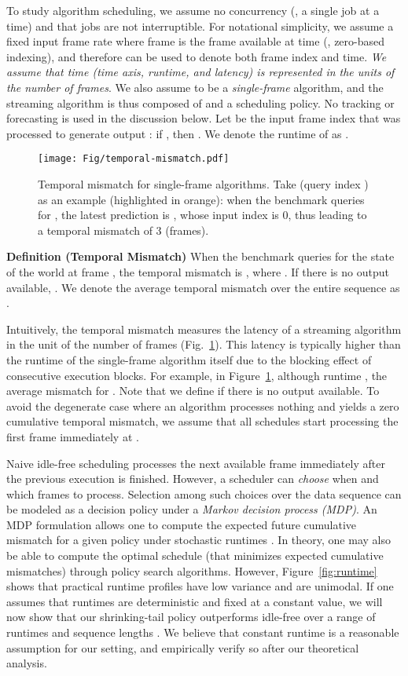 To study algorithm scheduling, we assume no concurrency (\ie, a single job at a time) and that jobs are not interruptible. For notational simplicity, we assume a fixed input frame rate where frame  is the frame available at time  (\ie, zero-based indexing), and therefore  can be used to denote both frame index and time. {\em We assume that time (time axis, runtime, and latency) is represented in the units of the number of frames}. We also assume  to be a {\em single-frame} algorithm, and the streaming algorithm  is thus composed of  and a scheduling policy. No tracking or forecasting is used in the discussion below.
Let  be the input frame index that was processed to generate output : if , then . We denote the runtime of  as . 

\begin{figure}[!b]
\centering
\texttt{[image: Fig/temporal-mismatch.pdf]}

\caption{Temporal mismatch for single-frame algorithms. Take  
(query index )
as an example (highlighted in orange): when the benchmark queries for , the latest prediction is , whose input index is 0, thus leading to a temporal mismatch of 3 (frames).}
\label{fig:temporalmismatch}
\end{figure}

{\noindent \bf Definition (Temporal Mismatch)} When the benchmark queries for the state of the world at frame , the temporal mismatch is , where .
If there is no output available, . We denote the average temporal mismatch over the entire sequence as .

Intuitively, the temporal mismatch measures the latency of a streaming algorithm  in the unit of the number of frames (Fig.~\ref{fig:temporalmismatch}). This latency is typically higher than the runtime of the single-frame algorithm  itself due to the blocking effect of consecutive execution blocks. For example, in Figure~\ref{fig:temporalmismatch}, although runtime , the average mismatch  for . Note that we define  if there is no output available. To avoid the degenerate case where an algorithm processes nothing and yields a zero cumulative temporal mismatch, we assume that all schedules start processing the first frame immediately at .

 Naive idle-free scheduling processes the next available frame immediately after the previous execution is finished. However, a scheduler can {\em choose} when and which frames to process. Selection among such choices over the data sequence can be modeled as a decision policy under a {\em Markov decision process (MDP)}. An MDP formulation allows one to compute the expected future cumulative mismatch for a given policy under stochastic runtimes .
In theory, one may also be able to compute the optimal schedule (that minimizes expected cumulative mismatches) through policy search algorithms. 
However, Figure~\ref{fig:runtime} shows that practical runtime profiles have low variance and are unimodal. If one assumes that runtimes are deterministic and fixed at a constant value, we will now show that our shrinking-tail policy outperforms idle-free over a range of runtimes  and sequence lengths . We believe that constant runtime is a reasonable assumption for our setting, and empirically verify so after our theoretical analysis. 

